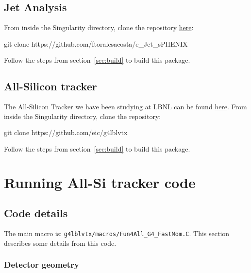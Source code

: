 \documentclass[12pt]{article}
\begin{document}
\subsection{Jet Analysis}

From inside the Singularity directory, clone the repository \href{https://github.com/ftoralesacosta/e_Jet_sPHENIX}{here}:

\begin{tcolorbox}
\begin{verbnobox}[\scriptsize]
git clone https://github.com/ftoralesacosta/e_Jet_sPHENIX
\end{verbnobox}  
\end{tcolorbox}

Follow the steps from section~\ref{sec:build} to build this package.

\subsection{All-Silicon tracker}

The All-Silicon Tracker we have been studying at LBNL can be found \href{https://github.com/eic/g4lblvtx}{here}.
From inside the Singularity directory, clone the repository:

\begin{tcolorbox}
\begin{verbnobox}[\scriptsize]
git clone https://github.com/eic/g4lblvtx
\end{verbnobox}  
\end{tcolorbox}

Follow the steps from section~\ref{sec:build} to build this package.

\newpage
\section{Running All-Si tracker code}

\subsection{Code details}

The main macro is: \verb|g4lblvtx/macros/Fun4All_G4_FastMom.C|.
This section describes some details from this code.

\subsubsection{Detector geometry}
\end{document}
